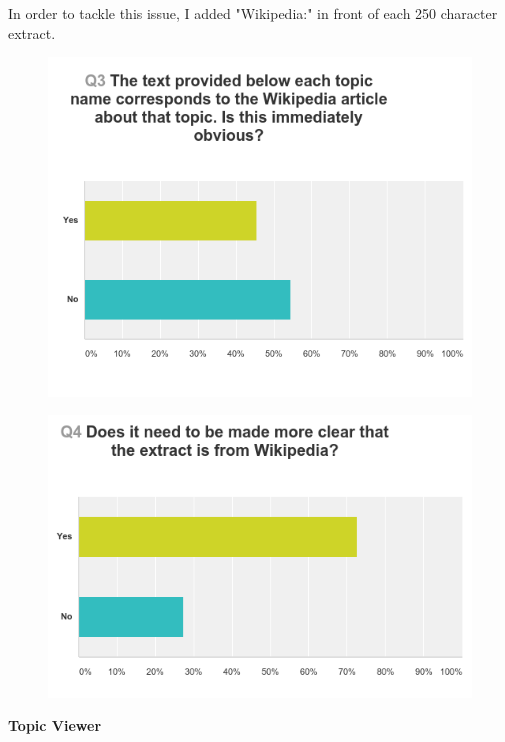 \documentclass[12pt]{article}
\begin{document}
In order to tackle this issue, I added "Wikipedia:" in front of each 250 character extract. \\

\begin{figure}[ht!]
  \centering
    \includegraphics[scale=0.5]{ui1.png}
   \caption[A graph depicting responses to the User Interface Survey]{}
   \label{ui1}
\end{figure} 

\begin{figure}[ht!]
  \centering
    \includegraphics[scale=0.5]{ui2.png}
   \caption[A graph depicting responses to the User Interface Survey]{}
   \label{ui2}
\end{figure} 

\textbf{Topic Viewer}
\end{document}
